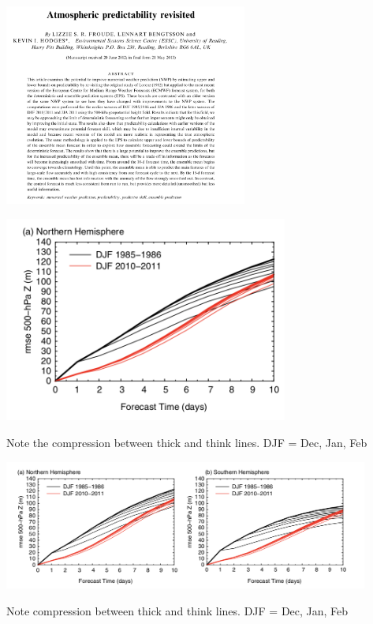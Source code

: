 \documentclass[aspectratio=169]{beamer}
\begin{document}
\begin{frame}

\begin{center}
\includegraphics[width = 0.6\textwidth]{figures/froude_atmospheric_2013_title_abstract}
\end{center}

\end{frame}
\begin{frame}

\begin{center}
\includegraphics[width = 0.7\textwidth]{figures/froude_atmospheric_2013_fig2a}
\end{center}

\vfill
Note the compression between thick and think lines. DJF = Dec, Jan, Feb
\end{frame}
\begin{frame}

\begin{center}
\includegraphics[width = 0.9\textwidth]{figures/froude_atmospheric_2013_fig2ab}
\end{center}

\vfill
\small{Note compression between thick and think lines. DJF = Dec, Jan, Feb}
\end{frame}
\end{document}
